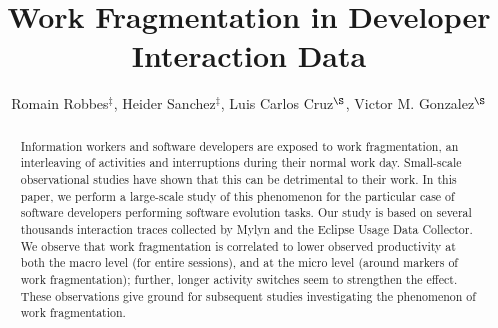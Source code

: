 \documentclass[times]{smrauth}
\begin{document}
%


\title{ Work Fragmentation in Developer Interaction Data}

\author{Romain Robbes$^{\ddagger}$, Heider Sanchez$^{\ddagger}$, Luis Carlos Cruz$^{\S}$, Victor M. Gonzalez$^{\S}$}

\address{$^{\ddagger}$: Computer Science Department (DCC), University of Chile, Chile;
$^{\S}$: Instituto Tecnologico Autonomo de Mexico, Mexico}







\begin{abstract}
Information workers and software developers are exposed to work fragmentation, an interleaving of activities and interruptions during their normal work day. Small-scale observational studies have shown that this can be detrimental to their work. In this paper, we perform a large-scale study of this phenomenon for the particular case of software developers performing software evolution tasks. Our study is based on several thousands interaction traces collected by Mylyn and the Eclipse Usage Data Collector. We observe that work fragmentation is correlated to lower observed productivity at both the macro level (for entire sessions), and at the micro level (around markers of work fragmentation); further, longer activity switches seem to strengthen the effect. These observations give ground for subsequent studies investigating the phenomenon of work fragmentation.
\end{abstract}



\maketitle
\end{document}
